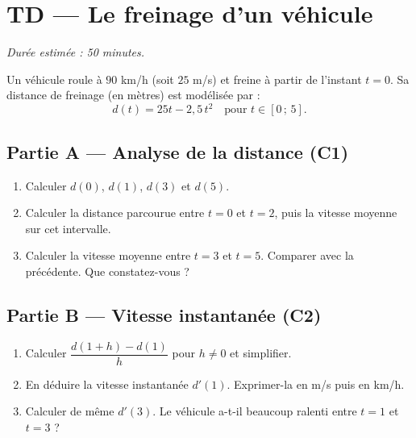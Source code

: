 

\section*{TD — Le freinage d'un véhicule}

\textit{Durée estimée : 50 minutes.}

\bigskip

Un véhicule roule à $90$ km/h (soit $25$ m/s) et freine à partir de l'instant $t=0$.
Sa distance de freinage (en mètres) est modélisée par :
\[
  d(t) = 25t - 2{,}5\,t^2 \quad \text{pour } t \in [0\,;\,5].
\]

\subsection*{Partie A — Analyse de la distance (C1)}

\begin{enumerate}
  \item Calculer $d(0)$, $d(1)$, $d(3)$ et $d(5)$.
  \item Calculer la distance parcourue entre $t=0$ et $t=2$, puis la vitesse moyenne sur cet intervalle.
  \item Calculer la vitesse moyenne entre $t=3$ et $t=5$. Comparer avec la précédente. Que constatez-vous ?
\end{enumerate}


\subsection*{Partie B — Vitesse instantanée (C2)}

\begin{enumerate}[resume]
  \item Calculer $\dfrac{d(1+h)-d(1)}{h}$ pour $h
\neq 0$ et simplifier.
  \item En déduire la vitesse instantanée $d'(1)$. Exprimer-la en m/s puis en km/h.
  \item Calculer de même $d'(3)$. Le véhicule a-t-il beaucoup ralenti entre $t=1$ et $t=3$ ?
\end{enumerate}

